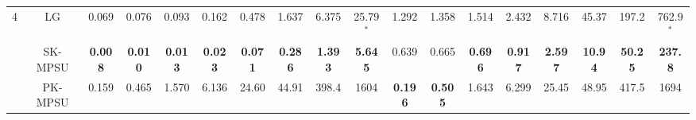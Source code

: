 \begin{table}[p]
\begin{adjustbox}{angle=90,center,scale=0.85}
\begin{tabular}{|c|c|c|c|c|c|c|c|c|c|c|c|c|c|c|c|c|c|}
\multirow{3}{*}{4}  
 & LG & \multicolumn{1}{c|}{0.069} & \multicolumn{1}{c|}{0.076} & \multicolumn{1}{c|}{0.093} & \multicolumn{1}{c|}{0.162} & \multicolumn{1}{c|}{0.478} & \multicolumn{1}{c|}{1.637} & \multicolumn{1}{c|}{6.375} & \multicolumn{1}{c|}{25.79$^*$} & \multicolumn{1}{c|}{1.292} & \multicolumn{1}{c|}{1.358} & \multicolumn{1}{c|}{1.514} & \multicolumn{1}{c|}{2.432} & \multicolumn{1}{c|}{8.716} & \multicolumn{1}{c|}{45.37} & \multicolumn{1}{c|}{197.2} & \multicolumn{1}{c|}{762.9$^*$} \\ \cline{2-18} 
 & SK-MPSU & \multicolumn{1}{c|}{\textbf{0.008}} & \multicolumn{1}{c|}{\textbf{0.010}} & \multicolumn{1}{c|}{\textbf{0.013}} & \multicolumn{1}{c|}{\textbf{0.023}} & \multicolumn{1}{c|}{\textbf{0.071}} & \multicolumn{1}{c|}{\textbf{0.286}} & \multicolumn{1}{c|}{\textbf{1.393}} & \multicolumn{1}{c|}{\textbf{5.645}} & \multicolumn{1}{c|}{0.639} & \multicolumn{1}{c|}{0.665} & \multicolumn{1}{c|}{\textbf{0.696}} & \multicolumn{1}{c|}{\textbf{0.917}} & \multicolumn{1}{c|}{\textbf{2.597}} & \multicolumn{1}{c|}{\textbf{10.94}} & \multicolumn{1}{c|}{\textbf{50.25}} & \multicolumn{1}{c|}{\textbf{237.8}} \\ \cline{2-18} 
 & PK-MPSU & \multicolumn{1}{c|}{0.159} & \multicolumn{1}{c|}{0.465} & \multicolumn{1}{c|}{1.570} & \multicolumn{1}{c|}{6.136} & \multicolumn{1}{c|}{24.60} & \multicolumn{1}{c|}{44.91} & \multicolumn{1}{c|}{398.4} & \multicolumn{1}{c|}{1604} & \multicolumn{1}{c|}{\textbf{0.196}} & \multicolumn{1}{c|}{\textbf{0.505}} & \multicolumn{1}{c|}{1.643} & \multicolumn{1}{c|}{6.299} & \multicolumn{1}{c|}{25.45} & \multicolumn{1}{c|}{48.95} & \multicolumn{1}{c|}{417.5} & \multicolumn{1}{c|}{1694} \\ \hline


\end{tabular}
\end{adjustbox}
\end{table}

